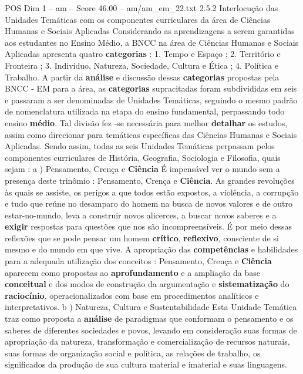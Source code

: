 \begin{textsample}{POS Dim 1 – am – Score 46.00 – am/am\_em\_22.txt}  \label{ex:f1_pos_228}
2.5.2 Interlocução das Unidades Temáticas com os componentes curriculares da área de Ciências Humanas e Sociais Aplicadas Considerando as aprendizagens a serem garantidas aos estudantes no Ensino Médio, a BNCC na área de Ciências Humanas e Sociais Aplicadas apresenta quatro \textbf{categorias} : 1.
Tempo e Espaço ; 2.
Território e Fronteira ; 3.
Indivíduo, Natureza, Sociedade, Cultura e Ética ; 4.
Política e Trabalho.
A partir da \textbf{análise} e discussão dessas \textbf{categorias} propostas pela BNCC - EM para a área, as \textbf{categorias} supracitadas foram subdivididas em seis e passaram a ser denominadas de Unidades Temáticas, seguindo o mesmo padrão de nomenclatura utilizada na etapa do ensino fundamental, perpassando todo ensino \textbf{médio}.
Tal divisão fez -se necessária para melhor \textbf{detalhar} os estudos, assim como direcionar para temáticas específicas das Ciências Humanas e Sociais Aplicadas.
Sendo assim, todas as seis Unidades Temáticas perpassam pelos componentes curriculares de História, Geografia, Sociologia e Filosofia, quais sejam : a ) Pensamento, Crença e \textbf{Ciência} É impensável ver o mundo sem a presença deste trinômio : Pensamento, Crença e \textbf{Ciência}.
As grandes revoluções às quais se assiste, os perigos a que todos estão expostos, a violência, a corrupção e tudo que reúne no desamparo do homem na busca de novos valores e de outro estar-no-mundo, leva a construir novos alicerces, a buscar novos saberes e a \textbf{exigir} respostas para questões que nos são incompreensíveis.
É por meio dessas reflexões que se pode pensar um homem \textbf{crítico}, \textbf{reflexivo}, consciente de si mesmo e do mundo em que vive.
A apropriação das \textbf{competências} e habilidades para a adequada utilização dos conceitos : Pensamento, Crença e \textbf{Ciência} aparecem como propostas ao \textbf{aprofundamento} e a ampliação da base \textbf{conceitual} e dos modos de construção da argumentação e \textbf{sistematização} do \textbf{raciocínio}, operacionalizados com base em procedimentos analíticos e interpretativos. b ) Natureza, Cultura e Sustentabilidade Esta Unidade Temática traz como proposta a \textbf{análise} de paradigmas que conformam o pensamento e os saberes de diferentes sociedades e povos, levando em consideração suas formas de apropriação da natureza, transformação e comercialização de recursos naturais, suas formas de organização social e política, as relações de trabalho, os significados da produção de sua cultura material e imaterial e suas linguagens.

\end{textsample}
